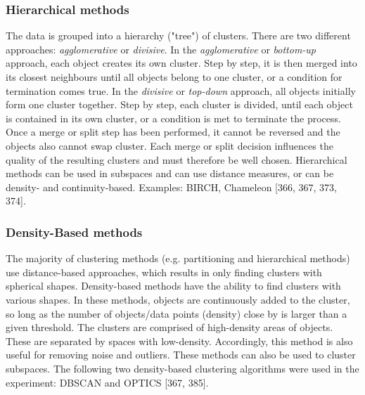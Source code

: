   \subsubsection{Hierarchical methods}
  The data is grouped into a hierarchy ("tree") of clusters. There are two different approaches: \textit{agglomerative} or \textit{divisive}. In the \textit{agglomerative} or \textit{bottom-up} approach, each object creates its own cluster. Step by step, it is then merged into its closest neighbours until all objects belong to one cluster, or a condition for termination comes true. In the \textit{divisive} or \textit{top-down} approach, all objects initially form one cluster together. Step by step, each cluster is divided, until each object is contained in its own cluster, or a condition is met to terminate the process. Once a merge or split step has been performed, it cannot be reversed and the objects also cannot swap cluster. Each merge or split decision influences the quality of the resulting clusters and must therefore be well chosen. Hierarchical methods can be used in subspaces and can use distance measures, or can be density- and continuity-based. Examples: BIRCH, Chameleon \autocite{han2011data}[366, 367, 373, 374].


  \subsubsection{Density-Based methods}
  \label{section:densityBasedMethods}
  The majority of clustering methods (e.g. partitioning and hierarchical methods) use distance-based approaches, which results in only finding clusters with spherical shapes. Density-based methods have the ability to find clusters with various shapes. In these methods, objects are continuously added to the cluster, so long as the number of objects/data points (density) close by is larger than a given threshold. The clusters are comprised of high-density areas of objects. These are separated by spaces with low-density. Accordingly, this method is also useful for removing noise and outliers. These methods can also be used to cluster subspaces. The following two density-based clustering algorithms were used in the experiment: DBSCAN and OPTICS \autocite{han2011data}[367, 385].
  



